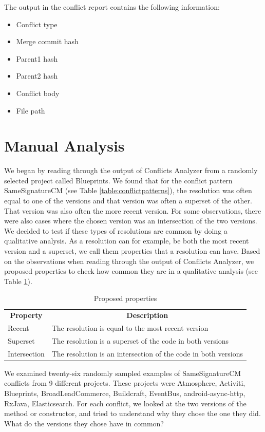 The output in the conflict report contains the following information:
\begin{itemize}
\item Conflict type
\item Merge commit hash
\item Parent1 hash
\item Parent2 hash
\item Conflict body
\item File path
\end{itemize}

\section{Manual Analysis}\label{sec:manual}
\FloatBarrier
We began by reading through the output of Conflicts Analyzer from a randomly selected project called Blueprints. We found that for the conflict pattern SameSignatureCM (see Table \ref{table:conflictpatterns}), the resolution was often equal to one of the versions and that version was often a superset of the other. That version was also often the more recent version. For some observations, there were also cases where the chosen version was an intersection of the two versions. We decided to test if these types of resolutions are common by doing a qualitative analysis. As a resolution can for example, be both the most recent version and a superset, we call them properties that a resolution can have. Based on the observations when reading through the output of Conflicts Analyzer, we proposed properties to check how common they are in a qualitative analysis (see Table \ref{table:pproperties}).
\begin{table}
\caption{Proposed properties}\label{table:pproperties}
\begin{tabular}{ p{7cm} p{7cm} }
\hline
\multicolumn{1}{c}{\textbf{Property}} & \multicolumn{1}{c}{\textbf{Description}}\\
Recent & The resolution is equal to the most recent version\\
Superset & The resolution is a superset of the code in both versions\\
Intersection & The resolution is an intersection of the code in both versions\\
\end{tabular}
\end{table}
\FloatBarrier

We examined twenty-six randomly sampled examples of SameSignatureCM conflicts from 9 different projects. These projects were Atmosphere, Activiti, Blueprints, BroadLeadCommerce, Buildcraft, EventBus, android-async-http, RxJava, Elasticsearch. For each conflict, we looked at the two versions of the method or constructor, and tried to understand why they chose the one they did. What do the versions they chose have in common?

